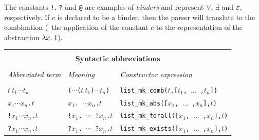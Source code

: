 The constants {\small\verb+!+}, {\small\verb+?+} and {\small\verb+@+}
are examples of \label{binder} \textit{binders}
%
%
and represent $\forall$, $\exists$ and $\varepsilon$, respectively.  If
$c$ is declared to be a binder, then the \HOL{} parser will translate
 to the combination 
(\ie\ the application of the constant $c$ to the representation of the
abstraction $\lambda x.\ t$).

\begin{center}

\begin{tabular}{|l|l|l|} \hline
\multicolumn{3}{|c|}{ } \\
\multicolumn{3}{|c|}{\bf Syntactic abbreviations} \\
\multicolumn{3}{|c|}{ } \\
{\it Abbreviated term} & {\it Meaning} &
{\it Constructor expression} \\ \hline
 & &  \\
$t\ t_1 \cdots t_n$ &
{\small\verb+(+}$\cdots${\small\verb+(+}$t\ t_1${\small\verb+)+}$\cdots t_n${\small\verb+)+} &
{\small\verb+list_mk_comb(+}$t${\small\verb+,[+}$t_1${\small\verb+, +}$\ldots${\small\verb+ ,+}$t_n${\small\verb+])+} \\ \hline
\holtxt{\bs}$x_1\cdots x_n${\small\verb+.+}$t$ &
\holtxt{\bs}$x_1${\small\verb+. +}$\cdots$\holtxt{ \bs}$x_n${\small\verb+.+}$t$ &
{\small\verb+list_mk_abs([+}$x_1${\small\verb+, +}$\ldots${\small\verb+ ,+}$x_n${\small\verb+],+}$t${\small\verb+)+}
\\ \hline
{\small\verb+!+}$x_1\cdots x_n${\small\verb+.+}$t$ &
{\small\verb+!+}$x_1${\small\verb+. +}$\cdots${\small\verb+ !+}$x_n${\small\verb+.+}$t$ &
{\small\verb+list_mk_forall([+}$x_1${\small\verb+, +}$\ldots${\small\verb+ ,+}$x_n${\small\verb+],+}$t${\small\verb+)+}
\\ \hline
{\small\verb+?+}$x_1\cdots x_n${\small\verb+.+}$t$ &
{\small\verb+?+}$x_1${\small\verb+. +}$\cdots${\small\verb+ ?+}$x_n${\small\verb+.+}$t$ &
{\small\verb+list_mk_exists([+}$x_1${\small\verb+, +}$\ldots${\small\verb+ ,+}$x_n${\small\verb+],+}$t${\small\verb+)+} \\
\hline
\end{tabular}
\end{center}

